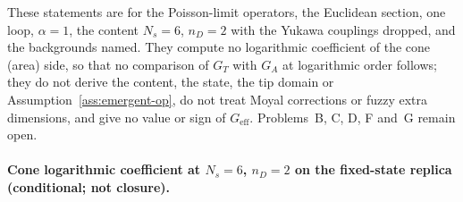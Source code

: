 These statements are for the Poisson-limit operators, the Euclidean section, one loop, \(\alpha=1\), the content \(N_s=6\), \(n_D=2\) with the Yukawa couplings dropped, and the backgrounds named. They compute no logarithmic coefficient of the cone (area) side, so that no comparison of \(G_T\) with \(G_A\) at logarithmic order follows; they do not derive the content, the state, the tip domain or Assumption~\ref{ass:emergent-op}, do not treat Moyal corrections or fuzzy extra dimensions, and give no value or sign of \(G_{\mathrm{eff}}\). Problems~B, C, D, F and~G remain open.

\paragraph{Cone logarithmic coefficient at \(N_s=6\), \(n_D=2\) on the fixed-state replica (conditional; not closure).}
